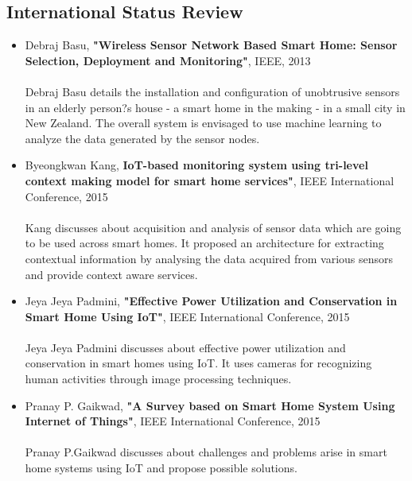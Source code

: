 \documentclass[12pt,a4paper,titlepage,twoside]{article}
\begin{document}
            \subsection{International Status Review}
            \begin{itemize}
                \item Debraj Basu, \textbf{"Wireless Sensor Network Based Smart Home: Sensor Selection, Deployment and Monitoring"}, IEEE, 2013\\ \\
                Debraj Basu details the installation and configuration of unobtrusive sensors in an elderly person?s house - a smart home in the making - in a small city in New Zealand. The overall system is envisaged to use machine learning to analyze the data generated by the sensor nodes.
                \item Byeongkwan Kang, \textbf{IoT-based monitoring system using tri-level context making model for smart home services"}, IEEE International Conference, 2015\\ \\
                Kang discusses about acquisition and analysis of sensor data which are going to be used across smart homes. It proposed an architecture for extracting contextual information by analysing the data acquired from various sensors and provide context aware services.
                \item Jeya Jeya Padmini, \textbf{"Effective Power Utilization and Conservation in Smart Home Using IoT"}, IEEE International Conference, 2015\\ \\
                Jeya Jeya Padmini discusses about effective power utilization and conservation in smart homes using IoT. It uses cameras for recognizing human activities through image processing techniques.
                \item Pranay P. Gaikwad, \textbf{"A Survey based on Smart Home System Using Internet of Things"}, IEEE International Conference, 2015\\ \\
                Pranay P.Gaikwad discusses about challenges and problems arise in smart home systems using IoT and propose possible solutions.
            \end{itemize}
        
        
\end{document}
